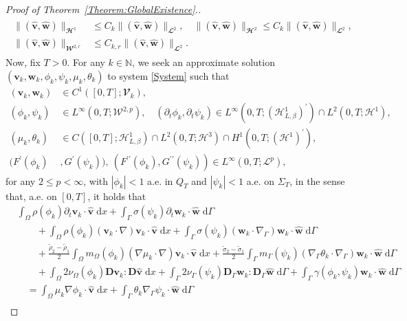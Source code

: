 \documentclass[10pt,reqno]{amsart}
\theoremstyle{remark}
\numberwithin{equation}{section}
\newcommand{\abs}[1]{| #1 |}
\newcommand{\norm}[1]{\| #1 \|}
\newcommand{\N}{\mathbb N}
\newcommand{\bv}{\mathbf{v}}
\newcommand{\bw}{\mathbf{w}}
\newcommand{\ww}{\widehat{\bw}}
\newcommand{\wv}{\widehat{\bv}}
\newcommand{\D}{\mathbf{D}}
\newcommand{\Dg}{\mathbf{D}_\Gamma}
\newcommand{\intO}{\int_\Omega}
\newcommand{\intG}{\int_\Gamma}
\newcommand{\dx}{\;\mathrm{d}x}
\newcommand{\dG}{\;\mathrm d\Ga}
\newcommand{\delt}{\partial_{t}}
\newcommand{\Grad}{\nabla}
\newcommand{\Gradg}{\nabla_\Ga}
\newcommand{\Om}{\Omega}
\newcommand{\Ga}{\Gamma}
\begin{document}
\begin{proof}[Proof of Theorem~\ref{Theorem:GlobalExistence}.]
\begin{align}
\begin{split}
        \norm{(\wv,\ww)}_{\mathbfcal{H}^1} &\leq C_k \norm{(\wv,\ww)}_{\mathbfcal{L}^2}, \quad \norm{(\wv,\ww)}_{\mathbfcal{H}^2} \leq C_k \norm{(\wv,\ww)}_{\mathbfcal{L}^2}, \\
        \norm{(\wv,\ww)}_{\mathbfcal{W}^{2,r}} &\leq C_{k,r}\norm{(\wv,\ww)}_{\mathbfcal{L}^2}.
    \end{split}
\end{align}
Now, fix $T > 0$. For any $k\in\N$, we seek an approximate solution $(\bv_k,\bw_k,\phi_k,\psi_k,\mu_k,\theta_k)$ to system \eqref{System} such that
\begin{subequations}\label{Reg:ApproxSolution}
    \begin{align}
        (\bv_k,\bw_k)&\in C^1([0,T];\mathbfcal{V}_k), \\
        (\phi_k,\psi_k)&\in L^\infty(0,T;\mathcal{W}^{2,p}), \quad(\delt\phi_k,\delt\psi_k)\in L^\infty(0,T;(\mathcal{H}^1_{L,\beta})^\prime)\cap L^2(0,T;\mathcal{H}^1), \\
        (\mu_k,\theta_k)&\in C([0,T];\mathcal{H}^1_{L,\beta})\cap L^2(0,T;\mathcal{H}^3)\cap H^1(0,T;(\mathcal{H}^1)^\prime), \\
        (F^\prime(\phi_k)&, G^\prime(\psi_k)), \ (F^{\prime\prime}(\phi_k),G^{\prime\prime}(\psi_k))\in L^\infty(0,T;\mathcal{L}^p),
    \end{align}
\end{subequations}
    for any $2 \leq p < \infty$, with $\abs{\phi_k} < 1$ a.e. in $Q_T$ and $\abs{\psi_k} < 1$ a.e. on $\Sigma_T$, in the sense that, a.e. on $[0,T]$, it holds that
    \begin{align}
        &\intO\rho(\phi_k)\delt\bv_k\cdot\wv\dx + \intG\sigma(\psi_k)\delt\bw_k\cdot\ww\dG \nonumber \\
        &\qquad + \intO\rho(\phi_k)(\bv_k\cdot\Grad)\bv_k\cdot\wv\dx + \intG\sigma(\psi_k)(\bw_k\cdot\Gradg)\bw_k\cdot\ww\dG \nonumber \\
        &\qquad + \frac{\tilde\rho_2 - \tilde\rho_1}{2}\intO m_\Om(\phi_k)(\Grad\mu_k\cdot\Grad)\bv_k\cdot\wv\dx + \frac{\tilde\sigma_2 - \tilde\sigma_1}{2}\intG m_\Ga(\psi_k)(\Gradg\theta_k\cdot\Gradg)\bw_k\cdot\ww\dG \label{WF:VW:DISCR} \\ 
        &\qquad  + \intO2\nu_\Om(\phi_k)\D\bv_k:\D\wv\dx + \intG2\nu_\Ga(\psi_k)\Dg\bw_k:\Dg\ww\dG + \intG \gamma(\phi_k,\psi_k)\bw_k\cdot\ww\dG \nonumber \\
        &\quad = \intO\mu_k\Grad\phi_k\cdot\wv\dx + \intG\theta_k\Gradg\psi_k\cdot\ww\dG \nonumber \\

\end{align}
\end{proof}
\end{document}
